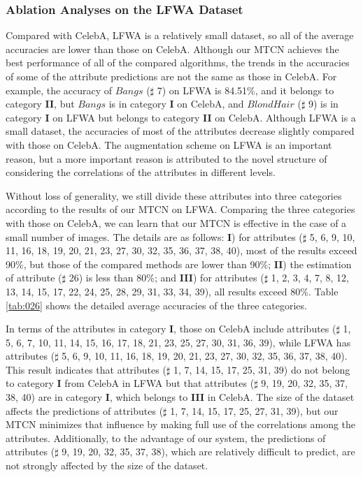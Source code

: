 \documentclass{sig-alternate-05-2015}
\begin{document}
\subsubsection{Ablation Analyses on the LFWA Dataset}
Compared with CelebA, LFWA is a relatively small dataset, so all of the average accuracies are lower than those on CelebA. Although our MTCN achieves the best performance of all of the compared algorithms, the trends in the accuracies of some of the attribute predictions are not the same as those in CelebA. For example, the accuracy of $Bangs$  ($\sharp$ 7) on LFWA is 84.51\%, and it belongs to category \textbf{II}, but $Bangs$ is in category \textbf{I} on CelebA, and $BlondHair$ ($\sharp$ 9) is in category \textbf{I} on LFWA but belongs to category \textbf{II} on CelebA. Although LFWA is a small dataset, the accuracies of most of the attributes decrease slightly compared with those on CelebA. The augmentation scheme on LFWA is an important reason, but a more important reason is attributed to the novel structure of considering the correlations of the attributes in different levels.





 Without loss of generality, we still divide these attributes into three categories according to the results of our MTCN on LFWA. Comparing the three categories with those on CelebA, we can learn that our MTCN is effective in the case of a small number of images. The details are as follows: \textbf{I}) for attributes ($\sharp$ 5, 6, 9, 10, 11, 16, 18, 19, 20, 21, 23, 27, 30, 32, 35, 36, 37, 38, 40), most of the results exceed 90\%, but those of the compared methods are lower than 90\%; \textbf{II}) the estimation of attribute ($\sharp$ 26) is less than 80\%; and \textbf{III}) for attributes ($\sharp$ 1, 2, 3, 4, 7, 8, 12, 13, 14, 15, 17, 22, 24, 25, 28, 29, 31, 33, 34, 39), all results exceed 80\%. Table \ref{tab:026} shows the detailed average accuracies of the three categories.

In terms of the attributes in category \textbf{I}, those on CelebA include attributes ($\sharp$ 1, 5, 6, 7, 10, 11, 14, 15, 16, 17, 18, 21, 23, 25, 27, 30, 31, 36, 39), while LFWA has attributes ($\sharp$ 5, 6, 9, 10, 11, 16, 18, 19, 20, 21, 23, 27, 30, 32, 35, 36, 37, 38, 40). This result indicates that attributes ($\sharp$ 1, 7, 14, 15, 17, 25, 31, 39) do not belong to category \textbf{I} from CelebA in LFWA but that attributes ($\sharp$ 9, 19, 20, 32, 35, 37, 38, 40) are in category \textbf{I}, which belongs to \textbf{III} in CelebA. The size of the dataset affects the predictions of attributes ($\sharp$ 1, 7, 14, 15, 17, 25, 27, 31, 39), but our MTCN minimizes that influence by making full use of the correlations among the attributes. Additionally, to the advantage of our system, the predictions of attributes ($\sharp$ 9, 19, 20, 32, 35, 37, 38), which are relatively difficult to predict, are not strongly affected by the size of the dataset.
\end{document}
